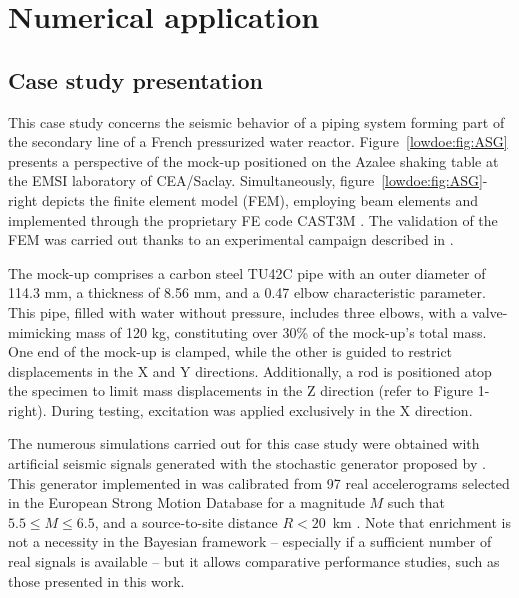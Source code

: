 



\section{Numerical application}\label{lowdoe:sec:application}

\subsection{Case study presentation}\label{lowdoe:sec:casestudy}

This case study concerns the seismic behavior of a piping system forming part of the secondary line of a French pressurized water reactor. Figure~\ref{lowdoe:fig:ASG} presents a perspective of the mock-up positioned on the Azalee shaking table at the EMSI laboratory of CEA/Saclay. Simultaneously, figure~\ref{lowdoe:fig:ASG}-right depicts the finite element model (FEM), employing beam elements and implemented through the proprietary FE code CAST3M \citep{cea_cast3m_2019}. The validation of the FEM was carried out thanks to an experimental campaign described in \cite{touboul_seismic_1999}.

The mock-up comprises a carbon steel TU42C pipe with an outer diameter of 114.3 mm, a thickness of 8.56 mm, and a 0.47 elbow characteristic parameter. This pipe, filled with water without pressure, includes three elbows, with a valve-mimicking mass of 120 kg, constituting over 30\% of the mock-up's total mass. One end of the mock-up is clamped, while the other is guided to restrict displacements in the X and Y directions. Additionally, a rod is positioned atop the specimen to limit mass displacements in the Z direction (refer to Figure 1-right). During testing, excitation was applied exclusively in the X direction.

The numerous simulations carried out for this case study were obtained with artificial seismic signals generated with the stochastic generator proposed by \citet{rezaeian_stochastic_2010}. This generator implemented in \cite{sainct_efficient_2020} was calibrated from 97 real accelerograms selected in the European Strong Motion Database for a magnitude $M$ such that $5.5 \leq M \leq 6.5$, and a source-to-site distance $R < 20$~km \citep{ambraseys_dissemination_2000}. Note that enrichment is not a necessity in the Bayesian framework -- especially if a sufficient number of real signals is available -- but it allows comparative performance studies, such as those presented in this work.

